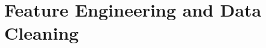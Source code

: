 \documentclass[
 size=14pt,
 paper=smartboard,  %
 mode=present, 		%
 display=slides, 	%
 style=tuliplab,  	%
 pauseslide,
 fleqn,leqno]{powerdot}
\begin{document}










 \section{Feature Engineering and Data Cleaning}
\end{document}
